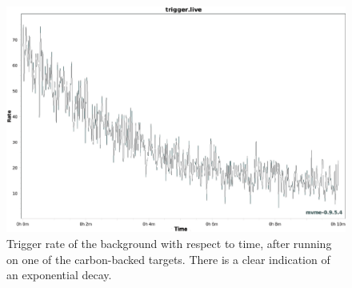 \begin{figure}
    \centering
    \includegraphics[scale=0.4]{Future_Figs/run005_triggerlive.eps}
    \caption{Trigger rate of the background with respect to time, after running on one of the carbon-backed targets. There is a clear indication of an exponential decay.}
    \label{fig:O15decay}
\end{figure}